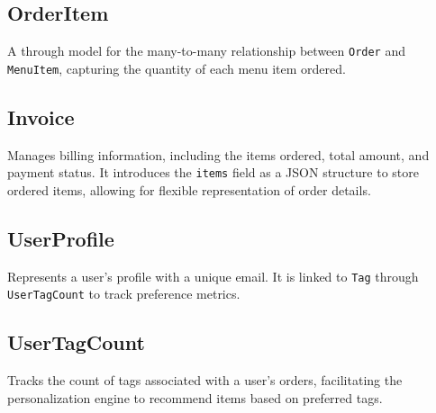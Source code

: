 \subsection{OrderItem}
A through model for the many-to-many relationship between \texttt{Order} and \texttt{MenuItem}, capturing the quantity of each menu item ordered.

\subsection{Invoice}
Manages billing information, including the items ordered, total amount, and payment status. It introduces the \texttt{items} field as a JSON structure to store ordered items, allowing for flexible representation of order details.

\subsection{UserProfile}
Represents a user's profile with a unique email. It is linked to \texttt{Tag} through \texttt{UserTagCount} to track preference metrics.

\subsection{UserTagCount}
Tracks the count of tags associated with a user's orders, facilitating the personalization engine to recommend items based on preferred tags.


